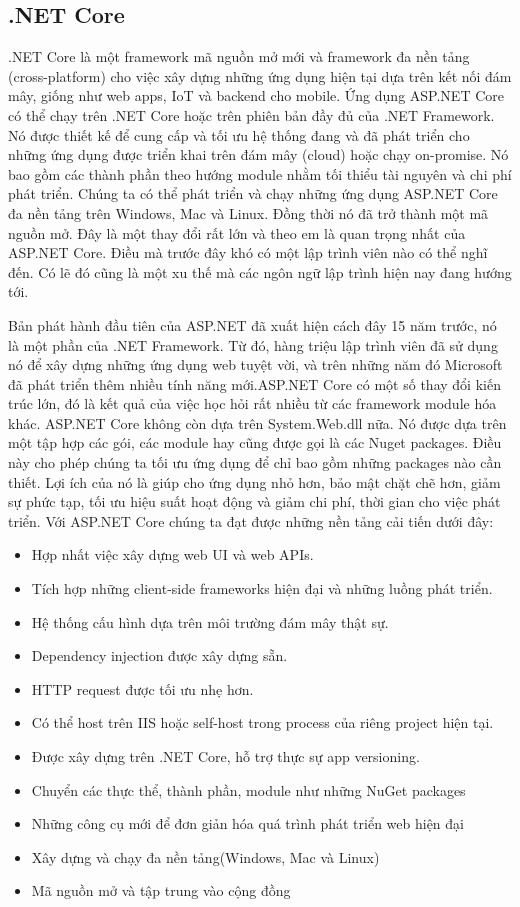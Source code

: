 \subsection{.NET Core}
.NET Core là một framework mã nguồn mở mới và framework đa nền tảng (cross-platform) cho việc xây dựng những ứng dụng hiện tại dựa trên kết nối đám mây, giống như web apps, IoT và backend cho mobile. Ứng dụng ASP.NET Core có thể chạy trên .NET Core hoặc trên phiên bản đầy đủ của .NET Framework. Nó được thiết kế để cung cấp và tối ưu hệ thống đang và đã phát triển cho những ứng dụng được triển khai trên đám mây (cloud) hoặc chạy on-promise. Nó bao gồm các thành phần theo hướng module nhằm tối thiểu tài nguyên và chi phí phát triển. Chúng ta có thể phát triển và chạy những ứng dụng ASP.NET Core đa nền tảng trên Windows, Mac và Linux. Đồng thời nó đã trở thành một mã nguồn mở. Đây là một thay đổi rất lớn và theo em là quan trọng nhất của ASP.NET Core. Điều mà trước đây khó có một lập trình viên nào có thể nghĩ đến. Có lẽ đó cũng là một xu thế mà các ngôn ngữ lập trình hiện nay đang hướng tới.
\par
Bản phát hành đầu tiên của ASP.NET đã xuất hiện cách đây 15 năm trước, nó là một phần của .NET Framework. Từ đó, hàng triệu lập trình viên đã sử dụng nó để xây dựng những ứng dụng web tuyệt vời, và trên những năm đó Microsoft đã phát triển thêm nhiều tính năng mới.ASP.NET Core có một số thay đổi kiến trúc lớn, đó là kết quả của việc học hỏi rất nhiều từ các framework module hóa khác. ASP.NET Core không còn dựa trên System.Web.dll nữa. Nó được dựa trên một tập hợp các gói, các module hay cũng được gọi là các Nuget packages. Điều này cho phép chúng ta tối ưu ứng dụng để chỉ bao gồm những packages nào cần thiết. Lợi ích của nó là giúp cho ứng dụng nhỏ hơn, bảo mật chặt chẽ hơn, giảm sự phức tạp, tối ưu hiệu suất hoạt động và giảm chi phí, thời gian cho việc phát triển. Với ASP.NET Core chúng ta đạt được những nền tảng cải tiến dưới đây:
\begin{itemize}
\item Hợp nhất việc xây dựng web UI và web APIs.
\item Tích hợp những client-side frameworks hiện đại và những luồng phát triển.
\item Hệ thống cấu hình dựa trên môi trường đám mây thật sự.
\item Dependency injection được xây dựng sẵn.
\item HTTP request được tối ưu nhẹ hơn.
\item Có thể host trên IIS hoặc self-host trong process của riêng project hiện tại.
\item Được xây dựng trên .NET Core, hỗ trợ thực sự app versioning.
\item Chuyển các thực thể, thành phần, module như những NuGet packages
\item Những công cụ mới để đơn giản hóa quá trình phát triển web hiện đại
\item Xây dựng và chạy đa nền tảng(Windows, Mac và Linux)
\item Mã nguồn mở và tập trung vào cộng đồng
\end{itemize}
